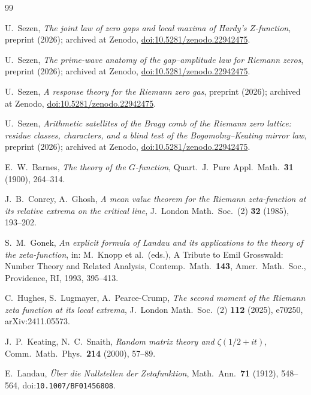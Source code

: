\documentclass[12pt]{amsart}
\theoremstyle{remark}
\newcommand{\1}{\mathbf{1}}
\begin{document}
\begin{thebibliography}{99}

 U.~Sezen, \emph{The joint law of zero gaps and local
maxima of Hardy's $Z$-function}, preprint (2026); archived at Zenodo,
\href{https://doi.org/10.5281/zenodo.22942475}{doi:10.5281/zenodo.22942475}.

 U.~Sezen, \emph{The prime-wave anatomy of the
gap--amplitude law for Riemann zeros}, preprint (2026); archived at Zenodo,
\href{https://doi.org/10.5281/zenodo.22942475}{doi:10.5281/zenodo.22942475}.

 U.~Sezen, \emph{A response theory for the Riemann
zero gas}, preprint (2026); archived at Zenodo,
\href{https://doi.org/10.5281/zenodo.22942475}{doi:10.5281/zenodo.22942475}.

 U.~Sezen, \emph{Arithmetic satellites of the Bragg
comb of the Riemann zero lattice: residue classes, characters, and a blind
test of the Bogomolny--Keating mirror law}, preprint (2026); archived at
Zenodo, \href{https://doi.org/10.5281/zenodo.22942475}{doi:10.5281/zenodo.22942475}.

 E.~W.~Barnes, \emph{The theory of the $G$-function},
Quart.\ J.\ Pure Appl.\ Math.\ \textbf{31} (1900), 264--314.

 J.~B.~Conrey, A.~Ghosh, \emph{A mean value theorem for the
Riemann zeta-function at its relative extrema on the critical line},
J.\ London Math.\ Soc.\ (2) \textbf{32} (1985), 193--202.

 S.~M.~Gonek, \emph{An explicit formula of Landau and its
applications to the theory of the zeta-function}, in: M.~Knopp et al.\
(eds.), A Tribute to Emil Grosswald: Number Theory and Related Analysis,
Contemp.\ Math.\ \textbf{143}, Amer.\ Math.\ Soc., Providence, RI, 1993,
395--413.

 C.~Hughes, S.~Lugmayer, A.~Pearce-Crump, \emph{The second
moment of the Riemann zeta function at its local extrema}, J.\ London
Math.\ Soc.\ (2) \textbf{112} (2025), e70250, arXiv:2411.05573.

 J.~P.~Keating, N.~C.~Snaith, \emph{Random matrix theory and
$\zeta(1/2+it)$}, Comm.\ Math.\ Phys.\ \textbf{214} (2000), 57--89.

 E.~Landau, \emph{\"Uber die Nullstellen der
Zetafunktion}, Math.\ Ann.\ \textbf{71} (1912), 548--564,
doi:\nolinkurl{10.1007/BF01456808}.


\end{thebibliography}
\end{document}
